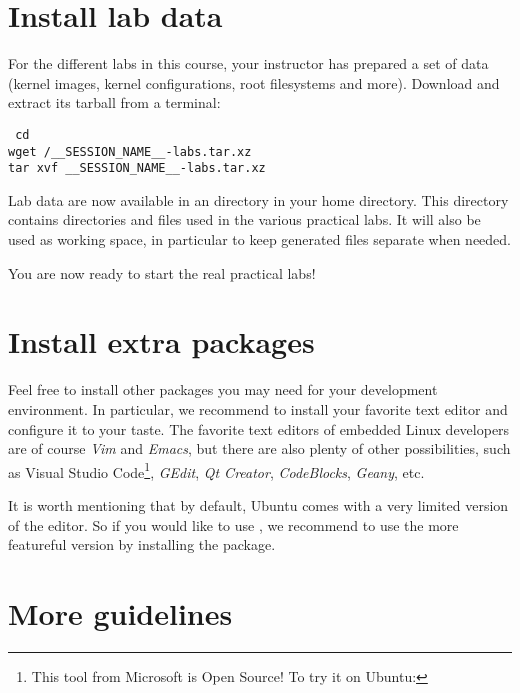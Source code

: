 
\section{Install lab data}

For the different labs in this course, your instructor has prepared a
set of data (kernel images, kernel configurations, root filesystems
and more). Download and extract its tarball from a terminal:

{\scriptsize
{\tt
cd \\
wget \sessionurl/__SESSION_NAME__-labs.tar.xz \\
tar xvf __SESSION_NAME__-labs.tar.xz \\
}
}

Lab data are now available in an  directory in
your home directory. This directory contains directories and files used in
the various practical labs. It will also be used as working space,
in particular to keep generated files separate when needed.

You are now ready to start the real practical labs!

\section{Install extra packages}

Feel free to install other packages you may need for your development
environment. In particular, we recommend to install your favorite text
editor and configure it to your taste. The favorite text editors of
embedded Linux developers are of course {\em Vim} and {\em Emacs}, but
there are also plenty of other possibilities, such as {Visual Studio
Code}\footnote{This tool from Microsoft is Open Source! To try it on
Ubuntu: }, {\em GEdit},
{\em Qt Creator}, {\em CodeBlocks}, {\em Geany}, etc.

It is worth mentioning that by default, Ubuntu comes with a very
limited version of the  editor. So if you would like to use
, we recommend to use the more featureful version by
installing the  package.

\section{More guidelines}

